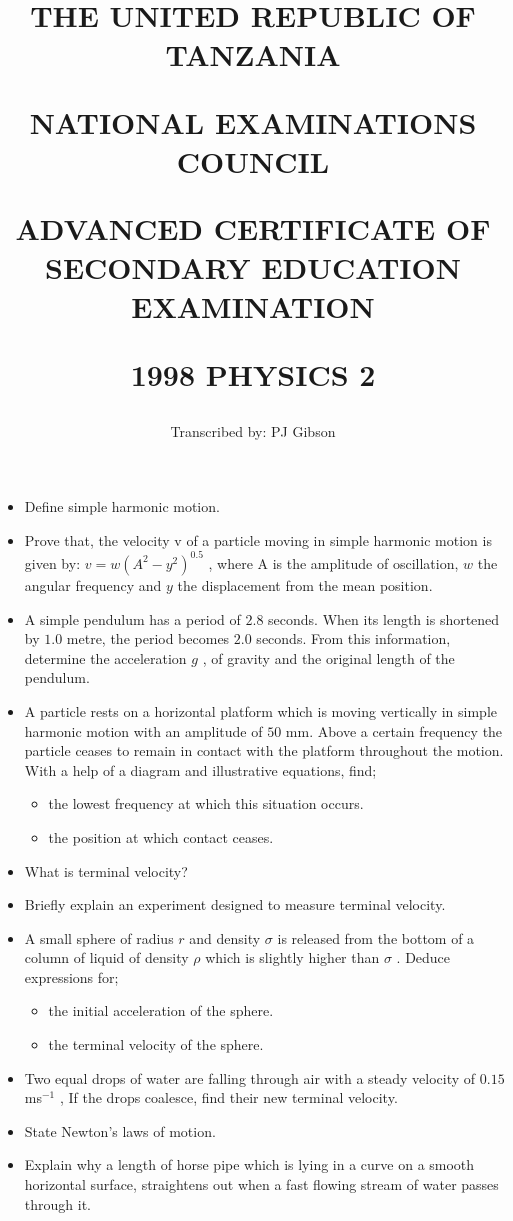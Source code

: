 \documentclass{article}
\title{THE UNITED REPUBLIC OF TANZANIA

NATIONAL EXAMINATIONS COUNCIL

ADVANCED CERTIFICATE OF SECONDARY EDUCATION EXAMINATION

\textbf{1998 PHYSICS 2}}
\author{Transcribed by:  PJ Gibson}
\begin{document}
\maketitle

\begin{itemize}
\item Define simple harmonic motion.
\item Prove that, the velocity v of a particle moving in simple harmonic motion is given by: $ v=w(A^{2}-y^{2})^{0.5}$ , where A is the amplitude of oscillation, $ w$ the angular frequency and $ y$ the displacement from the mean position.
\item A simple pendulum has a period of $ 2.8$ seconds. When its length is shortened by $ 1.0$ metre, the period becomes $ 2.0$ seconds. From this information, determine the acceleration $ g$ , of gravity and the original length of the pendulum.
\item A particle rests on a horizontal platform which is moving vertically in simple harmonic motion with an amplitude of $ 50$ mm. Above a certain frequency the particle ceases to remain in contact with the platform throughout the motion. With a help of a diagram and illustrative equations, find;
 \begin{itemize}
\item the lowest frequency at which this situation occurs.
\item the position at which contact ceases.
\end{itemize}
\item What is terminal velocity?
\item Briefly explain an experiment designed to measure terminal velocity.
\item A small sphere of radius $ r$ and density $ \sigma $ is released from the bottom of a column of liquid of density $ \rho $ which is slightly higher than $ \sigma $ . Deduce expressions for;
 \begin{itemize}
\item the initial acceleration of the sphere.
\item the terminal velocity of the sphere.
\end{itemize}
\item Two equal drops of water are falling through air with a steady velocity of $ 0.15$ ms$ ^{-1}$ , If the drops coalesce, find their new terminal velocity.
\item State Newton's laws of motion.
\item Explain why a length of horse pipe which is lying in a curve on a smooth horizontal surface, straightens out when a fast flowing stream of water passes through it.

\end{itemize}
\end{document}
